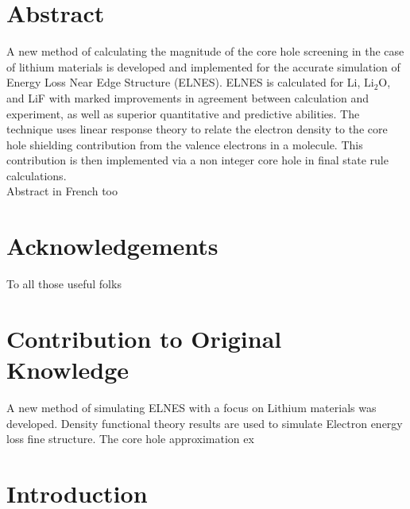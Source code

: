 \documentclass[12pt]{report}
\begin{document}









\chapter*{Abstract}
\renewcommand{\thepage}{\roman{page}}%


A new method of calculating the magnitude of the core hole screening in the case of lithium materials is developed and implemented for the accurate simulation of Energy Loss Near Edge Structure (ELNES).  ELNES is calculated for Li, $\mathrm{Li_2O}$, and LiF with marked improvements in agreement between calculation and experiment, as well as superior quantitative and predictive abilities.   The technique uses linear response theory to relate the electron density to the core hole shielding contribution from the valence electrons in a molecule.  This contribution is then implemented via a non integer core hole in final state rule calculations. 
\\
Abstract in French too

\chapter*{Acknowledgements}
To all those useful folks

\chapter*{Contribution to Original Knowledge}
A new method of simulating ELNES with a focus on Lithium materials was developed.  Density functional theory results are used to simulate Electron energy loss fine structure.  The core hole approximation ex



\tableofcontents

\chapter{Introduction}
\renewcommand{\thepage}{\arabic{page}}%
\setcounter{page}{1}%
\end{document}
